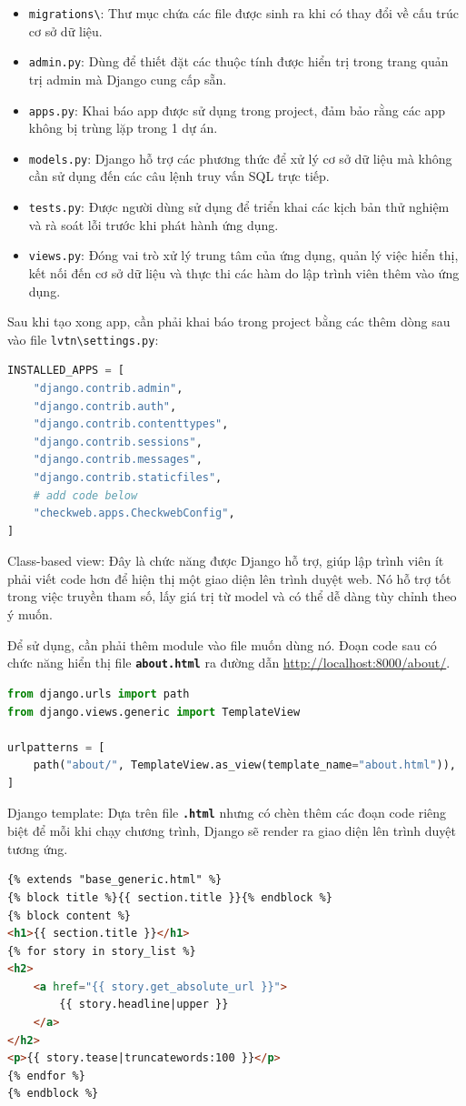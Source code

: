 \begin{itemize}
	\item \texttt{migrations\textbackslash}: Thư mục chứa các file được sinh ra khi có thay đổi về cấu trúc cơ sở dữ liệu.
	\item \texttt{admin.py}: Dùng để thiết đặt các thuộc tính được hiển trị trong trang quản trị admin mà Django cung cấp sẵn.
	\item \texttt{apps.py}: Khai báo app được sử dụng trong project, đảm bảo rằng các app không bị trùng lặp trong 1 dự án.
	\item \texttt{models.py}: Django hỗ trợ các phương thức để xử lý cơ sở dữ liệu mà không cần sử dụng đến các câu lệnh truy vấn SQL trực tiếp.
	\item \texttt{tests.py}: Được người dùng sử dụng để triển khai các kịch bản thử nghiệm và rà soát lỗi trước khi phát hành ứng dụng.
	\item \texttt{views.py}: Đóng vai trò xử lý trung tâm của ứng dụng, quản lý việc hiển thị, kết nối đến cơ sở dữ liệu và thực thi các hàm do lập trình viên thêm vào ứng dụng.
\end{itemize}
\par
Sau khi tạo xong app, cần phải khai báo trong project bằng các thêm dòng sau vào file \texttt{lvtn\textbackslash settings.py}:
\begin{lstlisting}[language=Python]
INSTALLED_APPS = [
    "django.contrib.admin",
    "django.contrib.auth",
    "django.contrib.contenttypes",
    "django.contrib.sessions",
    "django.contrib.messages",
    "django.contrib.staticfiles",
    # add code below
    "checkweb.apps.CheckwebConfig",
]
\end{lstlisting}
\par
Class-based view: Đây là chức năng được Django hỗ trợ, giúp lập trình viên ít phải viết code hơn để hiện thị một giao diện lên trình duyệt web. Nó hỗ trợ tốt trong việc truyền tham số, lấy giá trị từ model và có thể dễ dàng tùy chỉnh theo ý muốn.
\par
Để sử dụng, cần phải thêm module vào file muốn dùng nó. Đoạn code sau có chức năng hiển thị file \textbf{\texttt{about.html}} ra đường dẫn \url{http://localhost:8000/about/}.
\begin{lstlisting}[language=Python]
from django.urls import path
from django.views.generic import TemplateView

urlpatterns = [
	path("about/", TemplateView.as_view(template_name="about.html")),
]
\end{lstlisting}
\par
Django template: Dựa trên file \textbf{\texttt{.html}} nhưng có chèn thêm các đoạn code riêng biệt để mỗi khi chạy chương trình, Django sẽ render ra giao diện lên trình duyệt tương ứng.
\begin{lstlisting}[language=HTML]
{% extends "base_generic.html" %}
{% block title %}{{ section.title }}{% endblock %}
{% block content %}
<h1>{{ section.title }}</h1>
{% for story in story_list %}
<h2>
 	<a href="{{ story.get_absolute_url }}">
		{{ story.headline|upper }}
	</a>
</h2>
<p>{{ story.tease|truncatewords:100 }}</p>
{% endfor %}
{% endblock %}
\end{lstlisting}
